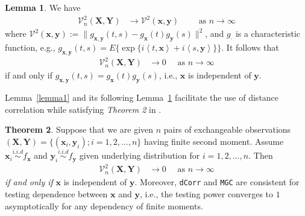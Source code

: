 \documentclass[12pt]{article}
\theoremstyle{definition}
\newtheorem{theorem}{Theorem}[section]
\newtheorem{lemma}[theorem]{Lemma}
\begin{document}
\begin{lemma}
	\label{lemma2}
We have 
	\begin{eqnarray}
		\mathcal{V}_{n}^{2}(\mathbf{X},\mathbf{Y}) &\longrightarrow \mathcal{V}^{2}(\mathbf{x},\mathbf{y}) \quad \quad \mbox{ as } n \rightarrow \infty
	\label{eq:conv1}
	\end{eqnarray}
where $\mathcal{V}^{2} (\mathbf{x},\mathbf{y}) := \| g_{\mathbf{x},\mathbf{y}}(t,s) - g_{\mathbf{x}}(t) g_{\mathbf{y}}(s) \|^2$, and $g_{\cdot}$ is a characteristic function, e.g., $g_{\mathbf{x},\mathbf{y}}(t,s) = E\{\exp\{i \left\langle t,\mathbf{x} \right\rangle  +i \left\langle  s,\mathbf{y}\right\rangle \}\}$.
	It follows that 
	\begin{eqnarray}
		\mathcal{V}_{n}^{2}(\mathbf{X},\mathbf{Y}) &\rightarrow 0 \quad \mbox{ as } n \rightarrow \infty
		\label{eq:conv2}
	\end{eqnarray}
	if and only if $g_{\mathbf{x},\mathbf{y}}(t,s) = g_{\mathbf{x}}(t) g_{\mathbf{y}}(s)$, i.e., $\mathbf{x}$ is independent of $\mathbf{y}$.
\end{lemma}
Lemma~\ref{lemma1} and its following Lemma~\ref{lemma2} facilitate the use of distance correlation while satisfying \textit{Theorem 2} in \cite{szekely2007measuring}.  

\begin{theorem}
	Suppose that we are given $n$ pairs of exchangeable observations $(\mathbf{X}, \mathbf{Y}) = \{  (\mathbf{x}_{i}, \mathbf{y}_{i} ) ; i = 1,2, \ldots, n \}$ having finite second moment. Assume $\mathbf{x}_{i} \overset{i.i.d}{\sim} f_{\mathbf{x}}$ and $\mathbf{y}_{i} \overset{i.i.d}{\sim} f_{\mathbf{y}}$ given underlying distribution for $i = 1,2, \ldots, n$. Then
	\begin{eqnarray}
		\mathcal{V}_{n}^{2}(\mathbf{X},\mathbf{Y}) &\longrightarrow 0 \quad \mbox{ as } n \rightarrow \infty
	\end{eqnarray}	
	\textit{if and only if} $\mathbf{x}$ is independent of $\mathbf{y}$. Moreover, \texttt{dCorr} and \texttt{MGC} are consistent for testing dependence between $\mathbf{x}$ and $\mathbf{y}$, i.e., the testing power converges to $1$ asymptotically for any dependency of finite moments.
	\label{theoremMain}
\end{theorem}
\end{document}
